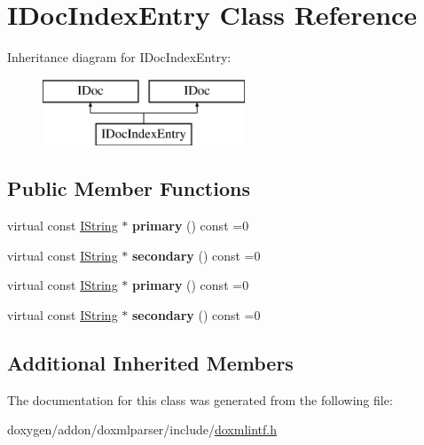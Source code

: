 \hypertarget{class_i_doc_index_entry}{}\section{I\+Doc\+Index\+Entry Class Reference}
\label{class_i_doc_index_entry}
Inheritance diagram for I\+Doc\+Index\+Entry\+:\begin{figure}[H]
\begin{center}
\leavevmode
\includegraphics[height=2.000000cm]{class_i_doc_index_entry}
\end{center}
\end{figure}
\subsection*{Public Member Functions}
\begin{DoxyCompactItemize}
\item 
\mbox{\label{class_i_doc_index_entry_ac71c233023bbb5b1027d0af5a397e1c6}} 
virtual const \mbox{\hyperlink{class_i_string}{I\+String}} $\ast$ {\bfseries primary} () const =0
\item 
\mbox{\label{class_i_doc_index_entry_a22b365b6167ff4264a36b5aa454de5ba}} 
virtual const \mbox{\hyperlink{class_i_string}{I\+String}} $\ast$ {\bfseries secondary} () const =0
\item 
\mbox{\label{class_i_doc_index_entry_ac71c233023bbb5b1027d0af5a397e1c6}} 
virtual const \mbox{\hyperlink{class_i_string}{I\+String}} $\ast$ {\bfseries primary} () const =0
\item 
\mbox{\label{class_i_doc_index_entry_a22b365b6167ff4264a36b5aa454de5ba}} 
virtual const \mbox{\hyperlink{class_i_string}{I\+String}} $\ast$ {\bfseries secondary} () const =0
\end{DoxyCompactItemize}
\subsection*{Additional Inherited Members}


The documentation for this class was generated from the following file\+:\begin{DoxyCompactItemize}
\item 
doxygen/addon/doxmlparser/include/\mbox{\hyperlink{include_2doxmlintf_8h}{doxmlintf.\+h}}\end{DoxyCompactItemize}
